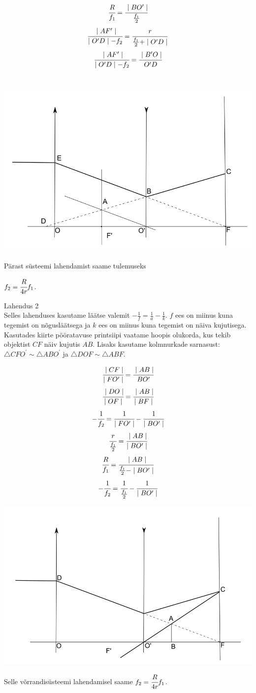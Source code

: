 {\[\]
\[
\cfrac{R}{f_1} = \cfrac{\mid BO ^\prime \mid}{\frac{f_1}{2}}
\]
\[
\cfrac{\mid AF^\prime \mid}{\mid O^\prime D \mid - f_2} = \cfrac{r}{\frac{f_1}{2} + \mid O ^\prime D \mid}
\]
\[
\cfrac{\mid AF^\prime \mid}{\mid O ^\prime D \mid - f_2} = \cfrac{\mid B^\prime O \mid}{O^\prime D} 
\]
\\
\begin{center}
	\includegraphics[width=0.5\linewidth]{2013-v3p-07-lah1.png}
\end{center}
Pärast süsteemi lahendamist saame tulemuseks 
\begin{center}
$f_2 = \cfrac{R}{4r} f_1$.
\end{center}

Lahendus 2 \\
Selles lahenduses kasutame läätse valemit $- \frac{1}{f} = \frac{1}{a} - \frac{1}{k}$. $f$ ees on miinus kuna tegemist on nõgusläätsega ja $k$ ees on miinus kuna tegemist on näiva kujutisega. Kasutades kiirte pööratavuse printsiipi vaatame hoopis olukorda, kus tekib objektist $CF$ näiv kujutis $AB$. Lisaks kasutame kolmnurkade sarnasust: $\triangle CFO ^\prime \sim \triangle ABO ^\prime$ ja $\triangle DOF \sim \triangle ABF$.

\[
\cfrac{\mid CF \mid}{\mid FO ^\prime \mid} = \cfrac{\mid AB \mid}{BO ^\prime}
\]
\[
\cfrac{\mid DO \mid}{\mid OF \mid} = \cfrac{\mid AB \mid}{\mid BF \mid}
\]
\[
- \cfrac{1}{f_2} = \cfrac{1}{\mid F O ^\prime \mid} - \cfrac{1}{\mid BO ^\prime\mid}
\]
\[
\cfrac{r}{\frac{f_1}{2}} = \cfrac{\mid AB \mid}{\mid BO ^\prime \mid}
\]
\[
\cfrac{R}{f_1} = \cfrac{\mid AB \mid}{\frac{f_1}{2} - \mid BO^\prime \mid}
\]
\[
- \cfrac{1}{f_2} = \cfrac{1}{\frac{f_1}{2}} - \cfrac{1}{\mid BO ^\prime \mid}
\]
\begin{center}
	\includegraphics[width=0.5\linewidth]{2013-v3p-07-lah2.png}
\end{center}
Selle võrrandisüsteemi lahendamisel saame $f_2 = \cfrac{R}{4r}f_1$.
\fi
}